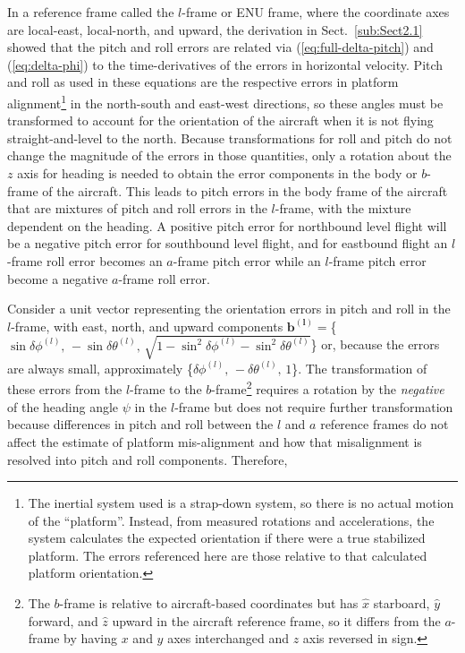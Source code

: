 \documentclass[english,british,amtd,bookmarks=false,unicode=true]{copernicus}\usepackage[]{graphicx}\usepackage[]{color}
\begin{document}
In a reference frame called the $l$-frame or ENU frame, where the
coordinate axes are local-east, local-north, and upward, the derivation
in Sect.~\ref{sub:Sect2.1} showed that the pitch and roll errors
are related via (\ref{eq:full-delta-pitch}) and (\ref{eq:delta-phi})
to the time-derivatives of the errors in horizontal velocity. Pitch
and roll as used in these equations are the respective errors in platform
alignment\footnote{The inertial system used is a strap-down system, so there is no actual
motion of the ``platform''. Instead, from measured rotations and
accelerations, the system calculates the expected orientation if there
were a true stabilized platform. The errors referenced here are those
relative to that calculated platform orientation.} in the north-south and east-west directions, so these angles must
be transformed to account for the orientation of the aircraft when
it is not flying straight-and-level to the north. Because transformations
for roll and pitch do not change the magnitude of the errors in those
quantities, only a rotation about the $z$ axis for heading is needed
to obtain the error components in the body or $b$-frame of the aircraft.
This leads to pitch errors in the body frame of the aircraft that
are mixtures of pitch and roll errors in the $l$-frame, with the
mixture dependent on the heading. A positive pitch error for northbound
level flight will be a negative pitch error for southbound level flight,
and for eastbound flight an $l$-frame roll error becomes an $a$-frame
pitch error while an $l$-frame pitch error become a negative $a$-frame
roll error. 

Consider a unit vector representing the orientation errors in pitch
and roll in the $l$-frame, with east, north, and upward components
$\mathbf{b^{(l)}=}$\{$\sin\delta\phi^{(l)},\,-\sin\delta\theta^{(l)},\,\sqrt{1-\sin^{2}\delta\phi^{(l)}-\sin^{2}\delta\theta^{(l)}}$\}
or, because the errors are always small, approximately \{$\delta\phi^{(l)},\,-\delta\theta^{(l)},\,1$\}.
The transformation of these errors from the $l$-frame to the $b$-frame\footnote{The $b$-frame is relative to aircraft-based coordinates but has $\hat{x}$
starboard, $\hat{y}$ forward, and $\hat{z}$ upward in the aircraft
reference frame, so it differs from the $a$-frame by having $x$
and $y$ axes interchanged and $z$ axis reversed in sign.} requires a rotation by the \emph{negative} of the heading angle $\psi$
in the $l$-frame but does not require further transformation because
differences in pitch and roll between the $l$ and $a$ reference
frames do not affect the estimate of platform mis-alignment and how
that misalignment is resolved into pitch and roll components. Therefore, 
\end{document}
